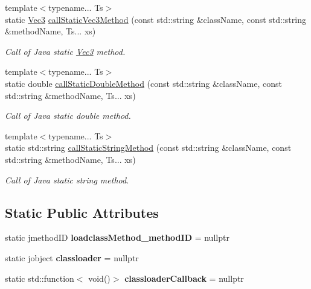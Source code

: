 \begin{DoxyCompactItemize}
{\footnotesize template$<$typename... Ts$>$ }\\static \hyperlink{classVec3}{Vec3} \hyperlink{classJniHelper_a9388a9c8636e4583b73ba913dfae9751}{call\+Static\+Vec3\+Method} (const std\+::string \&class\+Name, const std\+::string \&method\+Name, Ts... xs)
\begin{DoxyCompactList}\small\item\em Call of Java static \hyperlink{classVec3}{Vec3} method. \end{DoxyCompactList}\item 
{\footnotesize template$<$typename... Ts$>$ }\\static double \hyperlink{classJniHelper_a1a1bfc8c89a94a3ca24c2752f2123283}{call\+Static\+Double\+Method} (const std\+::string \&class\+Name, const std\+::string \&method\+Name, Ts... xs)
\begin{DoxyCompactList}\small\item\em Call of Java static double method. \end{DoxyCompactList}\item 
{\footnotesize template$<$typename... Ts$>$ }\\static std\+::string \hyperlink{classJniHelper_a1b3bdf85d19fe5e8a54dff67a42720da}{call\+Static\+String\+Method} (const std\+::string \&class\+Name, const std\+::string \&method\+Name, Ts... xs)
\begin{DoxyCompactList}\small\item\em Call of Java static string method. \end{DoxyCompactList}\end{DoxyCompactItemize}
\subsection*{Static Public Attributes}
\begin{DoxyCompactItemize}
\item 
\mbox{\label{classJniHelper_ab9b4cc15a0f2c170db49e4b0f4877b2d}} 
static jmethod\+ID {\bfseries loadclass\+Method\+\_\+method\+ID} = nullptr
\item 
\mbox{\label{classJniHelper_a35d9dace49b77d76135e28d281578a24}} 
static jobject {\bfseries classloader} = nullptr
\item 
\mbox{\label{classJniHelper_ab2bf60961a6a2d2aef6f642ef910eaef}} 
static std\+::function$<$ void()$>$ {\bfseries classloader\+Callback} = nullptr
\end{DoxyCompactItemize}


